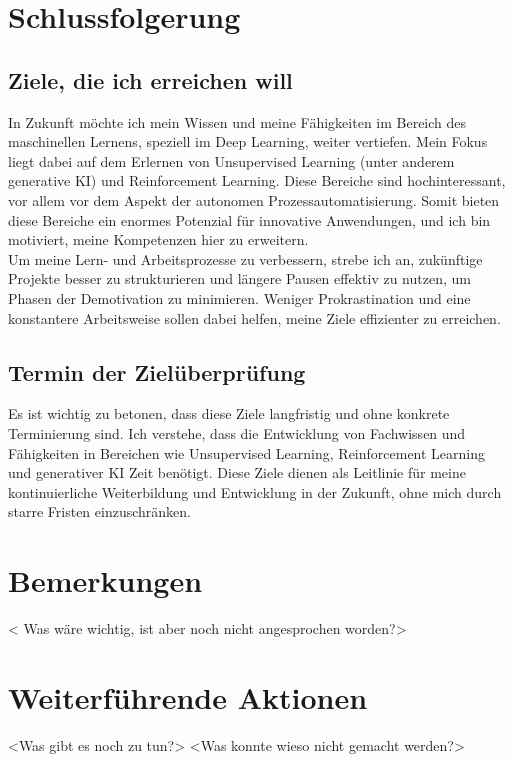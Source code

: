 \section{Schlussfolgerung}
\subsection{Ziele, die ich erreichen will}
In Zukunft möchte ich mein Wissen und meine Fähigkeiten im Bereich des maschinellen Lernens, speziell im Deep Learning, weiter vertiefen. Mein Fokus liegt dabei auf dem Erlernen von Unsupervised Learning (unter anderem generative KI) und Reinforcement Learning. Diese Bereiche sind hochinteressant, vor allem vor dem Aspekt der autonomen Prozessautomatisierung. Somit bieten diese Bereiche ein enormes Potenzial für innovative Anwendungen, und ich bin motiviert, meine Kompetenzen hier zu erweitern. 
\\
Um meine Lern- und Arbeitsprozesse zu verbessern, strebe ich an, zukünftige Projekte besser zu strukturieren und längere Pausen effektiv zu nutzen, um Phasen der Demotivation zu minimieren. Weniger Prokrastination und eine konstantere Arbeitsweise sollen dabei helfen, meine Ziele effizienter zu erreichen. 
\subsection{Termin der Zielüberprüfung}
Es ist wichtig zu betonen, dass diese Ziele langfristig und ohne konkrete Terminierung sind. Ich verstehe, dass die Entwicklung von Fachwissen und Fähigkeiten in Bereichen wie Unsupervised Learning, Reinforcement Learning und generativer KI Zeit benötigt. Diese Ziele dienen als Leitlinie für meine kontinuierliche Weiterbildung und Entwicklung in der Zukunft, ohne mich durch starre Fristen einzuschränken.

\section{Bemerkungen}
< Was wäre wichtig, ist aber noch nicht angesprochen worden?>

\section{Weiterführende Aktionen}
<Was gibt es noch zu tun?>
<Was konnte wieso nicht gemacht werden?>
